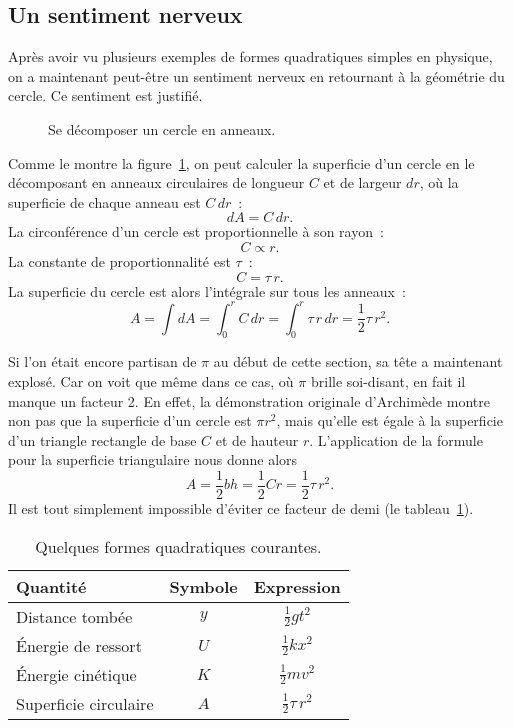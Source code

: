   \subsection{Un sentiment nerveux} %
  \label{sec:a_sense_of_foreboding}

Après avoir vu plusieurs exemples de formes quadratiques simples en physique, on
a maintenant peut-être un sentiment nerveux en retournant à la géométrie du
cercle. Ce sentiment est justifié.

\begin{figure}
\begin{center}
\end{center}
\caption{Se décomposer un cercle en anneaux.\label{fig:circular_area}}
\end{figure}


Comme le montre la figure~\ref{fig:circular_area}, on peut calculer la
superficie d'un cercle en le décomposant en anneaux circulaires de longueur $C$
et de largeur $dr$, où la superficie de chaque anneau est $C\,dr$~:
\[ dA = C\,dr. \]
La circonférence d'un cercle est proportionnelle à son rayon~:
\[ C \propto r. \]
La constante de proportionnalité est $\tau$~:
\[ C = \tau\,r. \]
La superficie du cercle est alors l'intégrale sur tous les anneaux~:
\[ A = \int dA = \int_0^r C\,dr = \int_0^r \tau\,r\,dr = \textstyle{\frac{1}{2}} \tau\,r^2. \]

Si l'on était encore partisan de $\pi$ au début de cette section, sa tête a
maintenant explosé. Car on voit que même dans ce cas, où $\pi$ brille
soi-disant, en fait il manque un facteur 2. En effet, la démonstration originale
d'Archimède montre non pas que la superficie d'un cercle est $\pi r^2$, mais
qu'elle est égale à la superficie d'un triangle rectangle de base $C$ et de
hauteur $r$. L'application de la formule pour la superficie triangulaire nous donne
alors
\[
  A = \textstyle{\frac{1}{2}} bh = \textstyle{\frac{1}{2}}Cr = \textstyle{\frac{1}{2}}\tau\,r^2.
\]
Il est tout simplement impossible d'éviter ce facteur de demi (le
tableau~\ref{table:quadratic_forms}).

\begin{table}
\begin{center}
\begin{tabular}{lcc}
Quantité & Symbole & Expression \\ \hline
Distance tombée & $y$ & $\textstyle{\frac{1}{2}}gt^2$ \smallskip \\
Énergie de ressort & $U$ & $\textstyle{\frac{1}{2}}kx^2$ \smallskip \\
Énergie cinétique & $K$ & $\textstyle{\frac{1}{2}}mv^2$ \smallskip \\
Superficie circulaire & $A$ & $\textstyle{\frac{1}{2}}\tau\,r^2$
\end{tabular}
\end{center}
\caption{Quelques formes quadratiques courantes.\label{table:quadratic_forms}}
\end{table}

